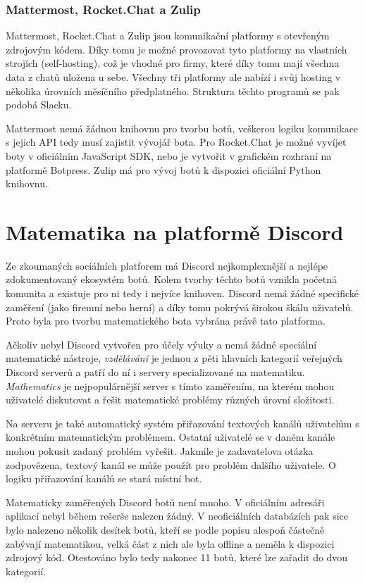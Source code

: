 \documentclass[FM]{tulthesis}
\begin{document}
	\subsection{Mattermost, Rocket.Chat a Zulip}
	
	Mattermost, Rocket.Chat a Zulip jsou komunikační platformy s otevřeným zdrojovým kódem. Díky tomu je možné provozovat tyto platformy na vlastních strojích (self-hosting), což je vhodné pro firmy, které díky tomu mají všechna data z chatů uložena u sebe. Všechny tři platformy ale nabízí i svůj hosting v několika úrovních měsíčního předplatného. Struktura těchto programů se pak podobá Slacku.
	
	Mattermost nemá žádnou knihovnu pro tvorbu botů, veškerou logiku komunikace s jejich API tedy musí zajistit vývojář bota. Pro Rocket.Chat je možné vyvíjet boty v oficiálním JavaScript SDK, nebo je vytvořit v grafickém rozhraní na platformě Botpress. Zulip má pro vývoj botů k dispozici oficiální Python knihovnu.
		
	\chapter{Matematika na platformě Discord}\label{Chapter3}
	
	Ze zkoumaných sociálních platforem má Discord nejkomplexnější a nejlépe zdokumentovaný ekosystém botů. Kolem tvorby těchto botů vznikla početná komunita a existuje pro ni tedy i nejvíce knihoven. Discord nemá žádné specifické zaměření (jako firemní nebo herní) a díky tomu pokrývá širokou škálu uživatelů. Proto byla pro tvorbu matematického bota vybrána právě tato platforma.
	
	Ačkoliv nebyl Discord vytvořen pro účely výuky a nemá žádné speciální matematické nástroje, \textit{vzdělávání} je jednou z pěti hlavních kategorií veřejných Discord serverů a patří do ní i servery specializované na matematiku. \textit{Mathematics} je nejpopulárnější server s tímto zaměřením, na kterém mohou uživatelé diskutovat a řešit matematické problémy různých úrovní složitosti.
	
	Na serveru je také automatický systém přiřazování textových kanálů uživatelům s konkrétním matematickým problémem. Ostatní uživatelé se v daném kanále mohou pokusit zadaný problém vyřešit. Jakmile je zadavatelova otázka zodpovězena, textový kanál se může použít pro problém dalšího uživatele. O logiku přiřazování kanálů se stará místní bot.
	
	Matematicky zaměřených Discord botů není mnoho. V oficiálním adresáři aplikací nebyl během rešerše nalezen žádný. V neoficiálních databázích pak sice bylo nalezeno několik desítek botů, kteří se podle popisu alespoň částečně zabývají matematikou, velká část z nich ale byla offline a neměla k dispozici zdrojový kód. Otestováno bylo tedy nakonec 11 botů, které lze zařadit do dvou kategorií.
	
\end{document}

